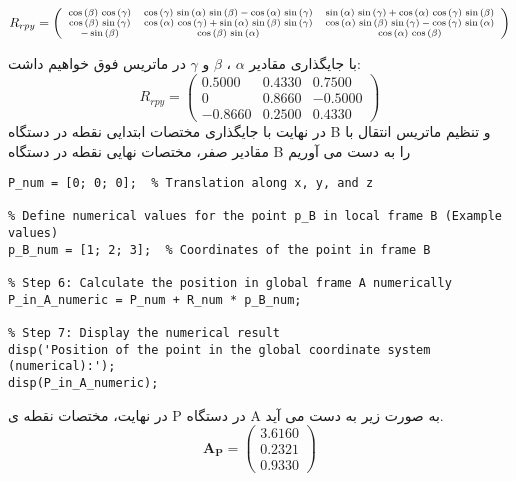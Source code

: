 \begin{enumerate}
\[
\scriptsize
R_{rpy} = \left(\begin{array}{ccc} 
	\cos \left(\beta \right)\,\cos \left(\gamma \right) & \cos \left(\gamma \right)\,\sin \left(\alpha \right)\,\sin \left(\beta \right)-\cos \left(\alpha \right)\,\sin \left(\gamma \right) & \sin \left(\alpha \right)\,\sin \left(\gamma \right)+\cos \left(\alpha \right)\,\cos \left(\gamma \right)\,\sin \left(\beta \right)\\
	\cos \left(\beta \right)\,\sin \left(\gamma \right) & \cos \left(\alpha \right)\,\cos \left(\gamma \right)+\sin \left(\alpha \right)\,\sin \left(\beta \right)\,\sin \left(\gamma \right) & \cos \left(\alpha \right)\,\sin \left(\beta \right)\,\sin \left(\gamma \right)-\cos \left(\gamma \right)\,\sin \left(\alpha \right)\\
	-\sin \left(\beta \right) & \cos \left(\beta \right)\,\sin \left(\alpha \right) & \cos \left(\alpha \right)\,\cos \left(\beta \right)
\end{array}\right)
\]

با جایگذاری مقادیر $\alpha$ ، $\beta$ و $\gamma$ در ماتریس فوق خواهیم داشت:
\[
R_{rpy} = \left(\begin{array}{ccc}
	0.5000 & 0.4330 & 0.7500 \\
	0 & 0.8660 & -0.5000 \\
	-0.8660 & 0.2500 & 0.4330
\end{array}\right)
\]
در نهایت با جایگذاری مختصات ابتدایی نقطه در دستگاه B و تنظیم ماتریس انتقال با مقادیر صفر، مختصات نهایی نقطه در دستگاه B را به دست می آوریم

\begin{latin}
	\begin{lstlisting}[frame=single,style=Matlab-Pyglike]
% Define numerical values for the translation vector P (Example values)
P_num = [0; 0; 0];  % Translation along x, y, and z

% Define numerical values for the point p_B in local frame B (Example values)
p_B_num = [1; 2; 3];  % Coordinates of the point in frame B

% Step 6: Calculate the position in global frame A numerically
P_in_A_numeric = P_num + R_num * p_B_num;

% Step 7: Display the numerical result
disp('Position of the point in the global coordinate system (numerical):');
disp(P_in_A_numeric);
	\end{lstlisting}
\end{latin}
در نهایت، مختصات نقطه ی P در دستگاه A به صورت زیر به دست می آید.
\[
\mathbf{A}_{\mathbf{P}} = \left(\begin{array}{c}
	3.6160 \\
	0.2321 \\
	0.9330
\end{array}\right)
\]


\end{enumerate}
